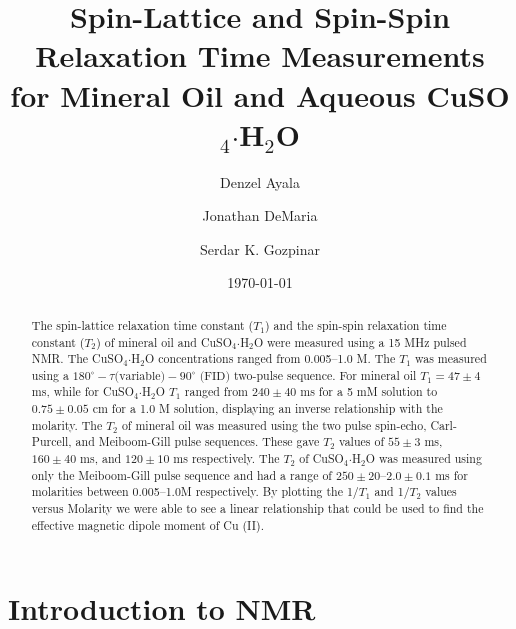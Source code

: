 \documentclass[
reprint,
amsmath,amssymb,
aps,
tikz,
border=5pt
]{revtex4-1}
\newcommand*{\cuso}[1][]{CuSO$_{4} \boldsymbol{\cdot} $H$_2$O }
\newcommand*{\tc}[1][1]{$T_#1$ }
\newcommand*{\tg}[1][2]{$T_#1$ }
\begin{document}

\title{Spin-Lattice and Spin-Spin Relaxation Time Measurements \\ for Mineral Oil and Aqueous \cuso}

\author{Denzel Ayala} 
\author{Jonathan DeMaria}
\author{Serdar K. Gozpinar}

%


\date{\today}%

\begin{abstract}

    The spin-lattice relaxation time constant ($T_1$) and the spin-spin relaxation time constant ($T_2$) of mineral oil and \cuso were measured using a 15 MHz pulsed NMR. The \cuso concentrations ranged from 0.005--1.0 M. The \tc was measured using a $180^{\circ}- \tau \text{(variable)} - 90^{\circ}\text{ (FID)}$ two-pulse sequence. For mineral oil $T_1 = 47 \pm 4$ ms, while for \cuso \tc ranged from $240\pm40$ ms for a 5 mM solution to $0.75\pm0.05$ cm for a 1.0 M solution, displaying an inverse relationship with the molarity. The \tg of mineral oil was measured using the two pulse spin-echo, Carl-Purcell, and Meiboom-Gill pulse sequences. These gave \tg values of $ 55 \pm 3 $ ms, $160 \pm 40 $ ms, and $120 \pm 10$ ms respectively. The \tg of \cuso was measured using only the Meiboom-Gill pulse sequence and had a range of $250 \pm 20$--$2.0\pm 0.1$ ms for molarities between 0.005--1.0M respectively.  By plotting the 1/\tc and 1/\tg values versus Molarity we were able to see a linear relationship that could be used to find the effective magnetic dipole moment of Cu (II).

\end{abstract}

\maketitle

\section*{\label{sec:intro}Introduction \lowercase{to} NMR}
\end{document}

